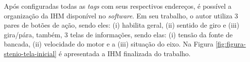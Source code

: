  Após configuradas todas as \textit{tags} com seus respectivos endereços, é possível a organização da \gls{IHM} disponível no \textit{software}. Em seu trabalho, o autor utiliza 3 pares de botões de ação, sendo eles: (i) habilita geral, (ii) sentido de giro e (iii) gira/pára, também, 3 telas de informações, sendo elas: (i) tensão da fonte de bancada, (ii) velocidade do motor e a (iii) situação do eixo. Na Figura \ref{fig:figura-stenio-tela-inicial} é apresentada a \gls{IHM} finalizada do trabalho.
    	
        \begin{figure}[!h]
    	\end{figure}
    	
        \begin{figure}[!h]
    	\end{figure}
    
